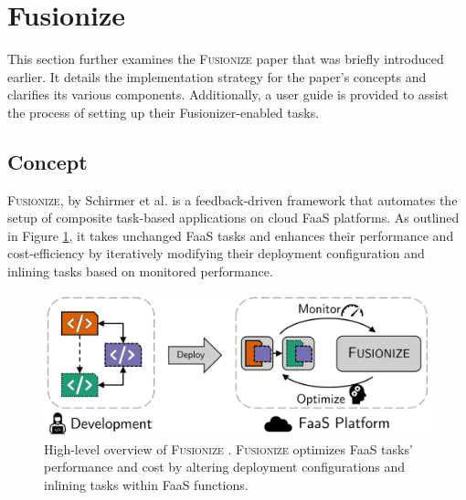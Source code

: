 
\section{Fusionize}\label{sec:fusionize}


This section further examines the \textsc{Fusionize} paper that was briefly
introduced earlier. It details the implementation strategy for the paper's
concepts and clarifies its various components. Additionally, a user guide is
provided to assist the process of setting up their Fusionizer-enabled tasks.

\subsection{Concept}

\textsc{Fusionize}, by Schirmer et al. \cite{schirmer2023fusionize} is a
feedback-driven framework that automates the setup of composite task-based
applications on cloud FaaS platforms. As outlined in Figure
\ref{fig:fusionize_highlvl}, it takes unchanged FaaS tasks and enhances their
performance and cost-efficiency by iteratively modifying their deployment
configuration and inlining tasks based on monitored performance.

\begin{figure}
    \centering
    \includegraphics[width=\linewidth]{figures/fusionize_highlvl}
    \caption{
        High-level overview of \textsc{Fusionize} \cite{schirmer2023fusionize}.
        \textsc{Fusionize} optimizes FaaS tasks' performance and cost by
        altering deployment configurations and inlining tasks within FaaS
        functions.
    }
    \label{fig:fusionize_highlvl}
\end{figure}

